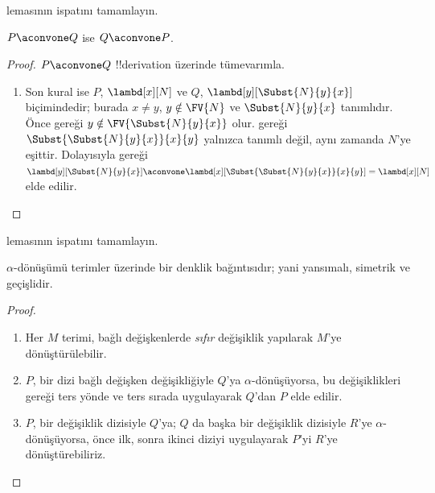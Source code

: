 \documentclass[../../../include/open-logic-section]{subfiles}
\begin{document}
\begin{prob}
   lemasının ispatını tamamlayın.
\end{prob}

\begin{lem}
  $P \aconvone Q$ ise $Q \aconvone P$.
\end{lem}

\begin{proof}
  $P \aconvone Q$ !!{derivation} üzerinde tümevarımla.
  \begin{enumerate}
  \item Son kural  ise $P$, $\lambd[x][N]$ ve $Q$,
    $\lambd[y][\Subst{N}{y}{x}]$ biçimindedir; burada $x\neq y$,
    $y\notin\FV{N}$ ve $\Subst{N}{y}{x}$ tanımlıdır. Önce
     gereği
    $y\notin\FV{\Subst{N}{y}{x}}$ olur.  gereği
    $\Subst{\Subst{N}{y}{x}}{x}{y}$ yalnızca tanımlı değil, aynı zamanda
    $N$'ye eşittir. Dolayısıyla  gereği
    $\lambd[y][\Subst{N}{y}{x}]
    \aconvone \lambd[x][\Subst{\Subst{N}{y}{x}}{x}{y}] =
    \lambd[x][N]$ elde edilir.
  \end{enumerate}
\end{proof}

\begin{prob}
   lemasının ispatını tamamlayın.
\end{prob}

\begin{thm}
  $\alpha$-dönüşümü terimler üzerinde bir denklik bağıntısıdır; yani
  yansımalı, simetrik ve geçişlidir.
\end{thm}

\begin{proof}
  \begin{enumerate}
  \item Her $M$ terimi, bağlı değişkenlerde \emph{sıfır} değişiklik yapılarak
    $M$'ye dönüştürülebilir.
  \item $P$, bir dizi bağlı değişken değişikliğiyle $Q$'ya
    $\alpha$-dönüşüyorsa, bu değişiklikleri  gereği ters
    yönde ve ters sırada uygulayarak $Q$'dan $P$ elde edilir.
  \item $P$, bir değişiklik dizisiyle $Q$'ya; $Q$ da başka bir değişiklik
    dizisiyle $R$'ye $\alpha$-dönüşüyorsa, önce ilk, sonra ikinci diziyi
    uygulayarak $P$'yi $R$'ye dönüştürebiliriz.
  \end{enumerate}
\end{proof}
\end{document}
